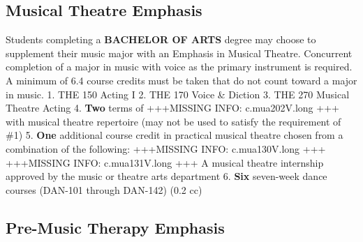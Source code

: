 \documentclass[
  letterpaper,
]{scrbook}
\begin{document}
\subsection{Musical Theatre Emphasis}\label{musical-theatre-emphasis}

Students completing a \textbf{BACHELOR OF ARTS} degree may choose to
supplement their music major with an Emphasis in Musical Theatre.
Concurrent completion of a major in music with voice as the primary
instrument is required. A minimum of 6.4 course credits must be taken
that do not count toward a major in music. 1. THE 150 Acting I 2. THE
170 Voice \& Diction 3. THE 270 Musical Theatre Acting 4. \textbf{Two}
terms of +++MISSING INFO: c.mua202V.long +++ with musical theatre
repertoire (may not be used to satisfy the requirement of \#1) 5.
\textbf{One} additional course credit in practical musical theatre
chosen from a combination of the following: +++MISSING INFO:
c.mua130V.long +++ +++MISSING INFO: c.mua131V.long +++ A musical theatre
internship approved by the music or theatre arts department 6.
\textbf{Six} seven-week dance courses (DAN-101 through DAN-142) (0.2 cc)

\subsection{Pre-Music Therapy
Emphasis}\label{pre-music-therapy-emphasis}
\end{document}
